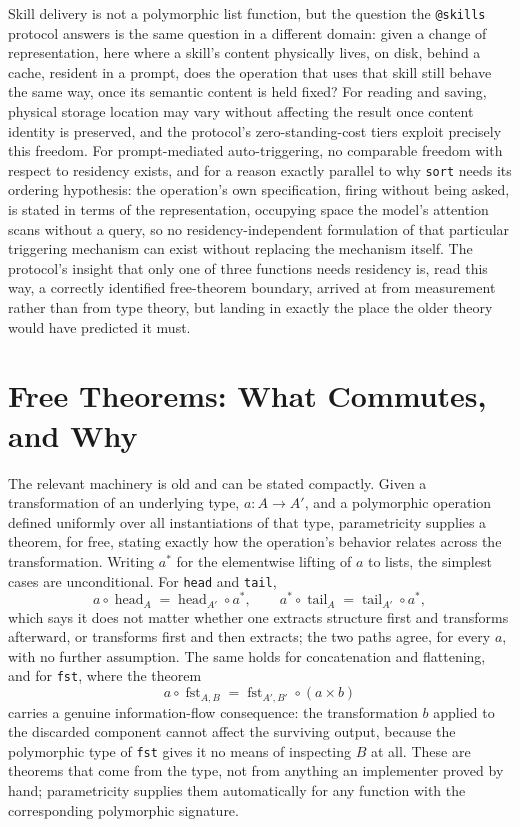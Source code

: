 \documentclass[11pt]{article}
\begin{document}
Skill delivery is not a polymorphic list function, but the question the \texttt{@skills} protocol answers is the same question in a different domain: given a change of representation, here where a skill's content physically lives, on disk, behind a cache, resident in a prompt, does the operation that uses that skill still behave the same way, once its semantic content is held fixed? For reading and saving, physical storage location may vary without affecting the result once content identity is preserved, and the protocol's zero-standing-cost tiers exploit precisely this freedom. For prompt-mediated auto-triggering, no comparable freedom with respect to residency exists, and for a reason exactly parallel to why \texttt{sort} needs its ordering hypothesis: the operation's own specification, firing without being asked, is stated in terms of the representation, occupying space the model's attention scans without a query, so no residency-independent formulation of that particular triggering mechanism can exist without replacing the mechanism itself. The protocol's insight that only one of three functions needs residency is, read this way, a correctly identified free-theorem boundary, arrived at from measurement rather than from type theory, but landing in exactly the place the older theory would have predicted it must.

\section{Free Theorems: What Commutes, and Why}

The relevant machinery is old and can be stated compactly. Given a transformation of an underlying type, $a : A \to A'$, and a polymorphic operation defined uniformly over all instantiations of that type, parametricity supplies a theorem, for free, stating exactly how the operation's behavior relates across the transformation. Writing $a^*$ for the elementwise lifting of $a$ to lists, the simplest cases are unconditional. For \texttt{head} and \texttt{tail},
\[
a \circ \operatorname{head}_A = \operatorname{head}_{A'} \circ a^*, \qquad a^* \circ \operatorname{tail}_A = \operatorname{tail}_{A'} \circ a^*,
\]
which says it does not matter whether one extracts structure first and transforms afterward, or transforms first and then extracts; the two paths agree, for every $a$, with no further assumption. The same holds for concatenation and flattening, and for \texttt{fst}, where the theorem
\[
a \circ \operatorname{fst}_{A,B} = \operatorname{fst}_{A',B'} \circ (a \times b)
\]
carries a genuine information-flow consequence: the transformation $b$ applied to the discarded component cannot affect the surviving output, because the polymorphic type of \texttt{fst} gives it no means of inspecting $B$ at all. These are theorems that come from the type, not from anything an implementer proved by hand; parametricity supplies them automatically for any function with the corresponding polymorphic signature.
\end{document}
